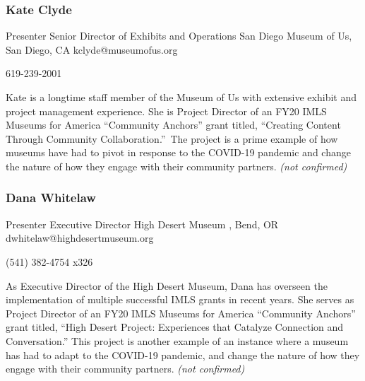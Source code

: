 \documentclass{report}
\begin{document}
              

              
                \subsubsection*{ Kate Clyde }
                Presenter\newline
                Senior Director of Exhibits and Operations\newline
                San Diego Museum of Us, San Diego, CA
                \newline
                kclyde@museumofus.org\newline
                
                619-239-2001\newline

                Kate is a longtime staff member of the Museum of Us with extensive exhibit and project management experience. She is Project Director of an FY20 IMLS Museums for America “Community Anchors” grant titled, “Creating Content Through Community Collaboration.” The project is a prime example of how museums have had to pivot in response to the COVID-19 pandemic and change the nature of how they engage with their community partners.
                \emph{ (not confirmed) }
              

              
                \subsubsection*{ Dana Whitelaw }
                Presenter\newline
                Executive Director\newline
                High Desert Museum , Bend, OR
                \newline
                dwhitelaw@highdesertmuseum.org\newline
                
                (541) 382-4754 x326\newline

                As Executive Director of the High Desert Museum, Dana has overseen the implementation of multiple successful IMLS grants in recent years. She serves as Project Director of an FY20 IMLS Museums for America “Community Anchors” grant titled, “High Desert Project: Experiences that Catalyze Connection and Conversation.” This project is another example of an instance where a museum has had to adapt to the COVID-19 pandemic, and change the nature of how they engage with their community partners.
                \emph{ (not confirmed) }
              
\end{document}
